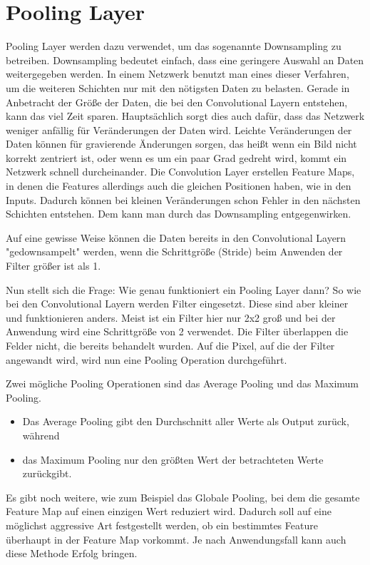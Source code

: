 \documentclass[12pt]{article}
\begin{document}
\cleardoublepage
\section{Pooling Layer}
Pooling Layer werden dazu verwendet, um das sogenannte Downsampling zu betreiben. Downsampling bedeutet einfach, dass eine geringere Auswahl an Daten weitergegeben werden.
In einem Netzwerk benutzt man eines dieser Verfahren, um die weiteren Schichten nur mit den nötigsten Daten zu belasten. Gerade in Anbetracht der Größe der Daten, die bei den Convolutional Layern entstehen, kann das viel Zeit sparen. Hauptsächlich sorgt dies auch dafür, dass das Netzwerk weniger anfällig für Veränderungen der Daten wird. Leichte Veränderungen der Daten können für gravierende Änderungen sorgen, das heißt wenn ein Bild nicht korrekt zentriert ist, oder wenn es um ein paar Grad gedreht wird, kommt ein Netzwerk schnell durcheinander.
Die Convolution Layer erstellen Feature Maps, in denen die Features allerdings auch die gleichen Positionen haben, wie in den Inputs. Dadurch können bei kleinen Veränderungen schon Fehler in den nächsten Schichten entstehen. Dem kann man durch das Downsampling entgegenwirken.

Auf eine gewisse Weise können die Daten bereits in den Convolutional Layern "gedownsampelt" werden, wenn die Schrittgröße (Stride) beim Anwenden der Filter größer ist als 1.

Nun stellt sich die Frage: Wie genau funktioniert ein Pooling Layer dann? So wie bei den Convolutional Layern werden Filter eingesetzt. Diese sind aber kleiner und funktionieren anders. Meist ist ein Filter hier nur 2x2 groß und bei der Anwendung wird eine Schrittgröße von 2 verwendet. Die Filter überlappen die Felder nicht, die bereits behandelt wurden. 
Auf die Pixel, auf die der Filter angewandt wird, wird nun eine Pooling Operation durchgeführt. 

Zwei mögliche Pooling Operationen sind das Average Pooling und das Maximum Pooling. 
\begin{itemize}
  \item Das Average Pooling gibt den Durchschnitt aller Werte als Output zurück, während
  \item das Maximum Pooling nur den größten Wert der betrachteten Werte zurückgibt.
\end{itemize}
Es gibt noch weitere, wie zum Beispiel das Globale Pooling, bei dem die gesamte Feature Map auf einen einzigen Wert reduziert wird. Dadurch soll auf eine möglichst aggressive Art festgestellt werden, ob ein bestimmtes Feature überhaupt in der Feature Map vorkommt. Je nach Anwendungsfall kann auch diese Methode Erfolg bringen.
\end{document}
